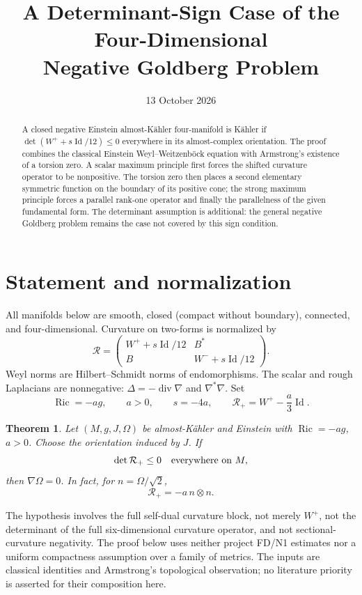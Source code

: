 \documentclass[11pt]{article}
\title{A Determinant-Sign Case of the Four-Dimensional\\Negative Goldberg Problem}
\author{}
\date{13 October 2026}
\newtheorem{theorem}{Theorem}[section]
\theoremstyle{remark}\newtheorem{remark}[theorem]{Remark}
\newcommand{\Ric}{\operatorname{Ric}}
\newcommand{\Id}{\operatorname{Id}}
\newcommand{\RR}{\mathcal R_+}
\begin{document}
\maketitle
\begin{abstract}
A closed negative Einstein almost-K\"ahler four-manifold is K\"ahler if
$\det(W^++s\Id/12)\le0$ everywhere in its almost-complex orientation.
The proof combines the classical Einstein Weyl--Weitzenb\"ock equation with
Armstrong's existence of a torsion zero. A scalar maximum principle first
forces the shifted curvature operator to be nonpositive. The torsion zero
then places a second elementary symmetric function on the boundary of its
positive cone; the strong maximum principle forces a parallel rank-one
operator and finally the parallelness of the given fundamental form.
The determinant assumption is additional: the general negative Goldberg
problem remains the case not covered by this sign condition.
\end{abstract}

\section{Statement and normalization}
All manifolds below are smooth, closed (compact without boundary), connected,
and four-dimensional. Curvature on two-forms is normalized by
\[
 \mathcal R=\begin{pmatrix}W^++s\Id/12&B^*\\ B&W^-+s\Id/12\end{pmatrix}.
\]
Weyl norms are Hilbert--Schmidt norms of endomorphisms. The scalar and rough
Laplacians are nonnegative: $\Delta=-\operatorname{div}\nabla$ and
$\nabla^*\nabla$. Set
\[
 \Ric=-a g,\qquad a>0,\qquad s=-4a,\qquad
 \RR=W^+-\frac a3\Id.
\]

\begin{theorem}\label{thm:main}
Let $(M,g,J,\Omega)$ be almost-K\"ahler and Einstein with $\Ric=-a g$,
$a>0$. Choose the orientation induced by $J$. If
\[
                 \det\RR\le0\quad\hbox{everywhere on }M,
\]
then $\nabla\Omega=0$. In fact, for $n=\Omega/\sqrt2$,
\[
                    \RR=-a\,n\otimes n.
\]
\end{theorem}

The hypothesis involves the full self-dual curvature block, not merely
$W^+$, not the determinant of the full six-dimensional curvature operator,
and not sectional-curvature negativity. The proof below uses neither
project FD/N1 estimates nor a uniform compactness assumption over a family
of metrics. The inputs are classical identities and Armstrong's topological
observation; no literature priority is asserted for their composition here.
\end{document}
